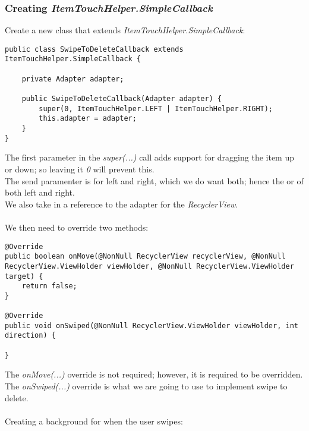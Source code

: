 \documentclass[]{article}
\renewcommand{\it}[1]{\textit{#1}}
\begin{document}
\subsubsection{Creating \it{ItemTouchHelper.SimpleCallback}}
Create a new class that extends \it{ItemTouchHelper.SimpleCallback}:
\begin{lstlisting}
public class SwipeToDeleteCallback extends ItemTouchHelper.SimpleCallback {
	
	private Adapter adapter;
	
	public SwipeToDeleteCallback(Adapter adapter) {
		super(0, ItemTouchHelper.LEFT | ItemTouchHelper.RIGHT);
		this.adapter = adapter;
	}
}
\end{lstlisting}
The first parameter in the \it{super(...)} call adds support for dragging the item up or down; so leaving it \it{0} will prevent this.
\\
The send paramenter is for left and right, which we do want both; hence the or of both left and right.
\\
We also take in a reference to the adapter for the \it{RecyclerView}.
\\\\
We then need to override two methods:
\begin{lstlisting}
@Override
public boolean onMove(@NonNull RecyclerView recyclerView, @NonNull RecyclerView.ViewHolder viewHolder, @NonNull RecyclerView.ViewHolder target) {
	return false;
}

@Override
public void onSwiped(@NonNull RecyclerView.ViewHolder viewHolder, int direction) {
	
}
\end{lstlisting}
The \it{onMove(...)} override is not required; however, it is required to be overridden.
\\
The \it{onSwiped(...)} override is what we are going to use to implement swipe to delete.
\\\\
Creating a background for when the user swipes:
\end{document}
